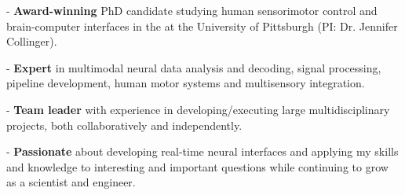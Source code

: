 \vspace*{0.05cm}

\begin{cvparagraph}
- \textbf{Award-winning} PhD candidate studying human sensorimotor control and brain-computer interfaces in the  at the University of Pittsburgh (PI: Dr. Jennifer Collinger). 

- \textbf{Expert} in multimodal neural data analysis and decoding, signal processing, pipeline development, human motor systems and multisensory integration.

- \textbf{Team leader} with experience in developing/executing large multidisciplinary projects, both collaboratively and independently.

- \textbf{Passionate} about developing real-time neural interfaces and applying my skills and knowledge to interesting and important questions while continuing to grow as a scientist and engineer.
\vspace*{-0.6cm}
\end{cvparagraph}
